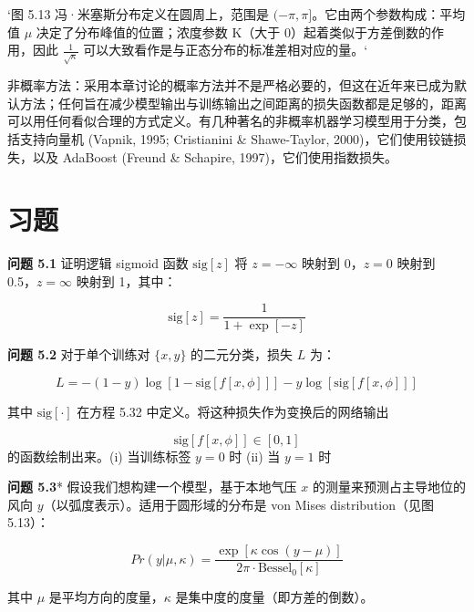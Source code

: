 `图 5.13 冯·米塞斯分布定义在圆周上，范围是 \((−\pi, \pi]\)。它由两个参数构成：平均值 \(\mu\) 决定了分布峰值的位置；浓度参数 K（大于 0）起着类似于方差倒数的作用，因此 \(\frac{1}{\sqrt{\kappa}}\) 可以大致看作是与正态分布的标准差相对应的量。`

非概率方法：采用本章讨论的概率方法并不是严格必要的，但这在近年来已成为默认方法；任何旨在减少模型输出与训练输出之间距离的损失函数都是足够的，距离可以用任何看似合理的方式定义。有几种著名的非概率机器学习模型用于分类，包括支持向量机 (Vapnik, 1995; Cristianini \& Shawe-Taylor, 2000)，它们使用铰链损失，以及 AdaBoost (Freund \& Schapire, 1997)，它们使用指数损失。


\section{习题}

\textbf{问题 5.1} 证明逻辑 sigmoid 函数 \(\text{sig}[z]\) 将 \(z = -\infty\) 映射到 0，\(z = 0\) 映射到 0.5，\(z = \infty\) 映射到 1，其中：

\begin{equation}
\text{sig}[z] = \frac{1}{1 + \exp[-z]} 
\end{equation}

\textbf{问题 5.2} 对于单个训练对 \(\{x, y\}\) 的二元分类，损失 \(L\) 为：

\begin{equation}
L = -(1 - y) \log [1 - \text{sig}[f[x, \phi]]] - y \log [\text{sig}[f[x, \phi]]] 
\end{equation}

其中 \(\text{sig}[\cdot]\) 在方程 5.32 中定义。将这种损失作为变换后的网络输出 

\begin{equation*}
	\text{sig}[f[x, \phi]] \in [0, 1]	
\end{equation*}
的函数绘制出来。(i) 当训练标签 \(y = 0\) 时 \hspace*{\fill} (ii) 当 \(y = 1\) 时 \hspace*{\fill} 


\textbf{问题 5.3}* 假设我们想构建一个模型，基于本地气压 \(x\) 的测量来预测占主导地位的风向 \(y\)（以弧度表示）。适用于圆形域的分布是 von Mises distribution（见图 5.13）：

\begin{equation}
Pr(y|\mu, \kappa) = \frac{\exp[\kappa \cos(y - \mu)]}{2\pi \cdot \text{Bessel}_0[\kappa]} 
\end{equation}

其中 \(\mu\) 是平均方向的度量，\(\kappa\) 是集中度的度量（即方差的倒数）。

